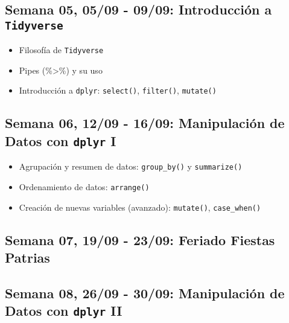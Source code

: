 \documentclass[11pt,letter,]{article}
\providecommand{\tightlist}{%
  \setlength{\itemsep}{0pt}\setlength{\parskip}{0pt}}
\begin{document}
\hypertarget{semana-05-0509---0909-introducciuxf3n-a-tidyverse}{%
\subsection{\texorpdfstring{Semana 05, 05/09 - 09/09: Introducción a
\texttt{Tidyverse}}{Semana 05, 05/09 - 09/09: Introducción a Tidyverse}}\label{semana-05-0509---0909-introducciuxf3n-a-tidyverse}}

\begin{itemize}
\tightlist
\item
  Filosofía de \texttt{Tidyverse}
\item
  Pipes (\%\textgreater\%) y su uso
\item
  Introducción a \texttt{dplyr}: \texttt{select()}, \texttt{filter()},
  \texttt{mutate()}
\end{itemize}

\hypertarget{semana-06-1209---1609-manipulaciuxf3n-de-datos-con-dplyr-i}{%
\subsection{\texorpdfstring{Semana 06, 12/09 - 16/09: Manipulación de
Datos con \texttt{dplyr}
I}{Semana 06, 12/09 - 16/09: Manipulación de Datos con dplyr I}}\label{semana-06-1209---1609-manipulaciuxf3n-de-datos-con-dplyr-i}}

\begin{itemize}
\tightlist
\item
  Agrupación y resumen de datos: \texttt{group\_by()} y
  \texttt{summarize()}
\item
  Ordenamiento de datos: \texttt{arrange()}
\item
  Creación de nuevas variables (avanzado): \texttt{mutate()},
  \texttt{case\_when()}
\end{itemize}

\hypertarget{semana-07-1909---2309-feriado-fiestas-patrias}{%
\subsection{Semana 07, 19/09 - 23/09: Feriado Fiestas
Patrias}\label{semana-07-1909---2309-feriado-fiestas-patrias}}

\hypertarget{semana-08-2609---3009-manipulaciuxf3n-de-datos-con-dplyr-ii}{%
\subsection{\texorpdfstring{Semana 08, 26/09 - 30/09: Manipulación de
Datos con \texttt{dplyr}
II}{Semana 08, 26/09 - 30/09: Manipulación de Datos con dplyr II}}\label{semana-08-2609---3009-manipulaciuxf3n-de-datos-con-dplyr-ii}}
\end{document}
